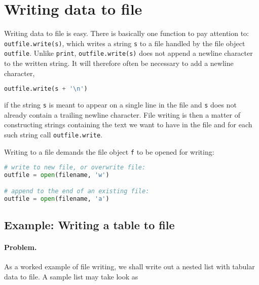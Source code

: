 \documentclass[graybox,sectrefs,envcountresetchap,open=right,final]{svmonodo}
\begin{document}
\section{Writing data to file}
\label{sec:files:writing}

Writing data to file is easy.
There is basically one function to pay attention to: \texttt{outfile.write(s)},
which writes a string \texttt{s} to
a file handled by the file object \texttt{outfile}. Unlike \texttt{print},
\texttt{outfile.write(s)}
does not append a newline character to the written string.
It will therefore
often be necessary to add a newline character,



\begin{lstlisting}[language=Python,style=simple,xleftmargin=2mm]
outfile.write(s + '\n')

\end{lstlisting}

if the string \texttt{s} is meant to appear on a single line in the file
and \texttt{s} does not already contain a trailing newline character.
File writing is then a matter of constructing strings containing the
text we want to have in the file and for each such string call
\texttt{outfile.write}.

Writing to a file demands
the file object \texttt{f}
to be opened for writing:







\begin{lstlisting}[language=Python,style=simple,xleftmargin=2mm]
# write to new file, or overwrite file:
outfile = open(filename, 'w')

# append to the end of an existing file:
outfile = open(filename, 'a')

\end{lstlisting}


\subsection{Example: Writing a table to file}

\paragraph{Problem.}
As a worked example of file writing,
we shall write out a nested list with tabular data to file.
A sample list may take look as
\end{document}
